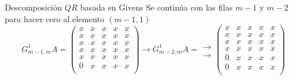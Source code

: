 \documentclass{beamer}
\begin{document}
  \begin{frame}{Descomposici\'on $QR$ basada en Givens}
   Se contin\'ua con las filas $m-1$ y $m-2$ para hacer cero al elemento $(m-1,1)$
   \footnotesize
   $$
  G^1_{m-1,m}A=\left(\begin{array}{ccccc}
           x & x & x & x & x\\
           x & x & x & x & x\\
           x & x & x & x & x\\
           x & x & x & x & x\\
           x & x & x & x & x\\
           0 & x & x & x & x\\
          \end{array}\right) \to G^1_{m-2,m}A = \begin{array}{r}
                                               \\
                                               \\
                                               \\
                                               \to\\
                                               \to\\
                                               \\
                                              \end{array}\left(\begin{array}{ccccc}
           x & x & x & x & x\\
           x & x & x & x & x\\
           x & x & x & x & x\\
           x & x & x & x & x\\
           0 & x & x & x & x\\
           0 & x & x & x & x\\
          \end{array}\right)
  $$
  \normalsize
\end{frame}
\end{document}
